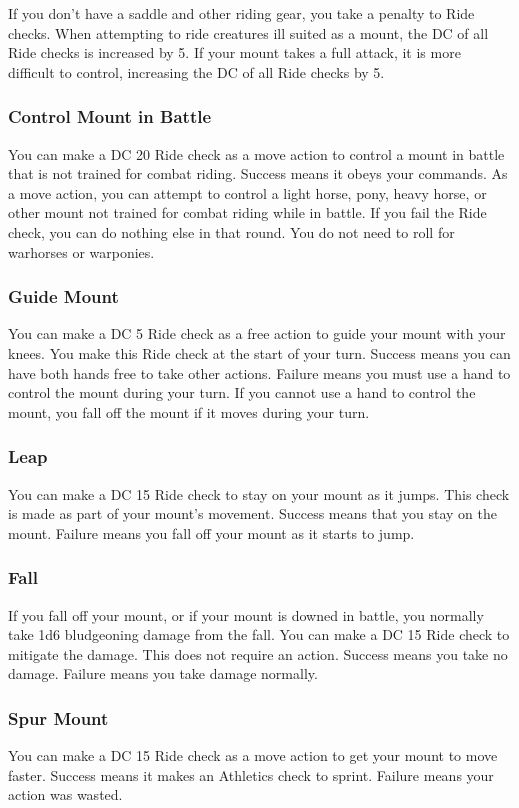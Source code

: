 If you don't have a saddle and other riding gear, you take a  penalty to Ride checks. When attempting to ride creatures ill suited as a mount, the DC of all Ride checks is increased by 5. If your mount takes a full attack, it is more difficult to control, increasing the DC of all Ride checks by 5. 

\subsubsection{Control Mount in Battle}
You can make a DC 20 Ride check as a move action to control a mount in battle that is not trained for combat riding. Success means it obeys your commands. 
 As a move action, you can attempt to control a light horse, pony, heavy horse, or other mount not trained for combat riding while in battle. If you fail the Ride check, you can do nothing else in that round. You do not need to roll for warhorses or warponies.

\subsubsection{Guide Mount}
You can make a DC 5 Ride check as a free action to guide your mount with your knees. You make this Ride check at the start of your turn. Success means you can have both hands free to take other actions. Failure means you must use a hand to control the mount during your turn. If you cannot use a hand to control the mount, you fall off the mount if it moves during your turn.

\subsubsection{Leap}
You can make a DC 15 Ride check to stay on your mount as it jumps. This check is made as part of your mount's movement. Success means that you stay on the mount. Failure means you fall off your mount as it starts to jump.

\subsubsection{Fall}
If you fall off your mount, or if your mount is downed in battle, you normally take 1d6 bludgeoning damage from the fall. You can make a DC 15 Ride check to mitigate the damage. This does not require an action. Success means you take no damage. Failure means you take damage normally. 

\subsubsection{Spur Mount}
You can make a DC 15 Ride check as a move action to get your mount to move faster. Success means it makes an Athletics check to sprint. Failure means your action was wasted. 

